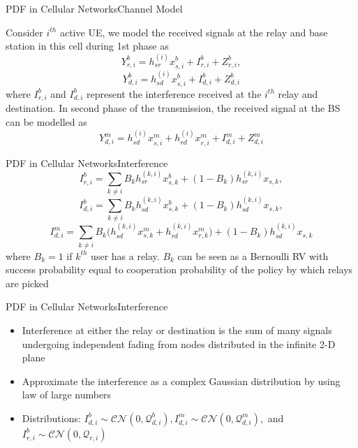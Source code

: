 \documentclass{beamer}
\begin{document}
\begin{frame}{PDF in Cellular Networks}{Channel Model}

Consider $i^{th}$ active UE, we model the received signals at the relay and base station in this cell during 1st phase as
\begin{equation*}
Y_{r,i}^b = h^{(i)}_{sr}x_{s,i}^b + I_{r,i}^b + Z_{r,i}^b,
\end{equation*}
\begin{equation*}
Y_{d,i}^b = h^{(i)}_{sd}x_{s,i}^b + I_{d,i}^b + Z_{d,i}^b
\end{equation*}
where $I_{r,i}^b$ and $I_{d,i}^b$ represent the interference received at the $i^{th}$ relay and destination. 
In second phase of the transmission, the received signal at the BS can be modelled as 
\begin{equation*}
Y_{d,i}^m = h^{(i)}_{sd}x_{s,i}^m + h^{(i)}_{rd}x_{r,i}^m+ I_{d,i}^m + Z_{d,i}^m
\end{equation*}
\end{frame}

\begin{frame}{PDF in Cellular Networks}{Interference}
\begin{equation*} 
I_{r,i}^b = \sum_{k \neq i} B_k h^{(k,i)}_{sr} x_{s,k}^b + (1-B_k)h_{sr}^{(k,i)}x_{s,k} ,
\end{equation*}
\begin{equation*}
I_{d,i}^b = \sum_{k \neq i} B_k h_{sd}^{(k,i)} x^b_{s,k} + (1-B_k)h_{sd}^{(k,i)}x_{s,k},
\end{equation*}
\begin{equation*} \label{eq:interferences}
I_{d,i}^m = \sum_{k \neq i} B_k \Big(h_{sd}^{(k,i)} x^m_{s,k} + h_{rd}^{(k,i)} x^m_{r,k}\Big) + (1-B_k)h_{sd}^{(k,i)}x_{s,k}
\end{equation*}
where $B_k = 1$ if $k^{th}$ user has a relay. $B_k$ can be seen as a Bernoulli RV with success probability equal to cooperation probability of the policy by which relays are picked  
\end{frame}

\begin{frame}{PDF in Cellular Networks}{Interference}
\begin{itemize}
\item Interference at either the relay or destination is the
sum of many signals undergoing independent fading from nodes distributed in the infinite 2-D plane
\item Approximate the interference as a complex Gaussian distribution by using law of large numbers
\item Distributions: $ I_{d,i}^b \sim \mathcal{CN} (0,\mathcal{Q}_{d,i}^b), I_{d,i}
^m \sim \mathcal{CN}(0,\mathcal{Q}_{d,i}^m),$ and $I_{r,i}^b \sim \mathcal{CN}
(0,\mathcal{Q}_{r,i})$
\end{itemize}
\end{frame}
\end{document}
